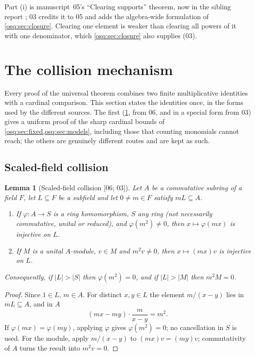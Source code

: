 \documentclass[11pt,letterpaper]{article}
\numberwithin{equation}{section}
\newtheorem{lemma}[lemma]{Lemma}
\theoremstyle{definition}
\theoremstyle{remark}
\theoremstyle{plain}
\newcommand{\src}[1]{\textup{\textsf{[#1]}}}
\begin{document}
Part (i) is manuscript~05's ``Clearing supports'' theorem, now in the sibling report
\cite{RepoOdg}; 03 credits it to 05 and adds the algebra-wide formulation of
\cref{osq:sec:closure}. Clearing one element is weaker than clearing all powers of it
with one denominator, which \cref{osq:sec:closure} also supplies (03).

\section{The collision mechanism}\label{osq:sec:collision}

Every proof of the universal theorem combines two finite multiplicative identities with a
cardinal comparison. This section states the identities once, in the forms used by the
different sources. The first (\cref{osq:lem:collision}, from 06, and in a special form
from 03) gives a uniform proof of the sharp cardinal bounds of
\cref{osq:sec:fixed,osq:sec:models}, including those that counting monomials cannot reach;
the others are genuinely different routes and are kept as such.

\subsection{Scaled-field collision}\label{osq:sub:scaled}

\begin{lemma}[Scaled-field collision \src{06; 03}]\label{osq:lem:collision}
Let $A$ be a commutative subring of a field $F$, let $L\subseteq F$ be a subfield and let
$0\neq m\in F$ satisfy $mL\subseteq A$.
\begin{enumerate}
\item If $\varphi:A\to S$ is a ring homomorphism, $S$ any ring (not necessarily
commutative, unital or reduced), and $\varphi(m^2)\neq0$, then $x\mapsto\varphi(mx)$ is
injective on $L$.
\item If $M$ is a unital $A$-module, $v\in M$ and $m^2v\neq0$, then $x\mapsto(mx)v$ is
injective on $L$.
\end{enumerate}
Consequently, if $|L|>|S|$ then $\varphi(m^2)=0$, and if $|L|>|M|$ then $m^2M=0$.
\end{lemma}
\begin{proof}
Since $1\in L$, $m\in A$. For distinct $x,y\in L$ the element $m/(x-y)$ lies in
$mL\subseteq A$, and in $A$
\begin{equation}\label{osq:eq:collision}
 (mx-my)\cdot\frac{m}{x-y}=m^2 .
\end{equation}
If $\varphi(mx)=\varphi(my)$, applying $\varphi$ gives $\varphi(m^2)=0$; no cancellation
in $S$ is used. For the module, apply $m/(x-y)$ to $(mx)v=(my)v$; commutativity of $A$
turns the result into $m^2v=0$.
\end{proof}
\end{document}
